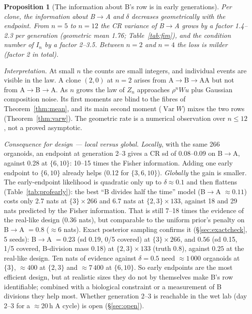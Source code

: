 \documentclass[11pt]{article}
\newtheorem{proposition}[theorem]{Proposition}
\theoremstyle{definition}
\theoremstyle{remark}
\newcommand{\Var}{\operatorname{Var}}
\begin{document}
\begin{proposition}[The information about B's row is in early generations]\label{prop:decay}
Per clone, the information about B$\to$A and $\delta$ decreases geometrically with the endpoint. From $n=5$ to $n=12$ the CR variance of B$\to$A grows by a factor 1.4--2.3 per generation (geometric mean 1.76; Table~\ref{tab:fim}), and the condition number of $I_n$ by a factor 2--3.5. Between $n=2$ and $n=4$ the loss is milder (factor 2 in total).
\end{proposition}
\noindent \emph{Interpretation.} At small $n$ the counts are small integers, and individual events are visible in the law. A clone $(2,0)$ at $n=2$ arises from A$\to$B$\to$AA but not from A$\to$B$\to$A. As $n$ grows the law of $Z_n$ approaches $\rho^nWu$ plus Gaussian composition noise. Its first moments are blind to the fibres of Theorem~\ref{thm:mean}, and its main second moment ($\Var W$) mixes the two rows (Theorem~\ref{thm:varw}). The geometric rate is a numerical observation over $n\le12$, not a proved asymptotic.

\noindent \emph{Consequence for design --- local versus global.} \emph{Locally}, with the same 266 organoids, an endpoint at generation 2--3 gives a CR sd of 0.08--0.09 on B$\to$A, against 0.28 at $\{6,10\}$: 10--15 times the Fisher information. Adding one early endpoint to $\{6,10\}$ already helps (0.12 for $\{3,6,10\}$). \emph{Globally} the gain is smaller. The early-endpoint likelihood is quadratic only up to $\delta\approx0.1$ and then flattens (Table~\ref{tab:profearly}): the best ``B divides half the time'' model (B$\to$A $\approx0.11$) costs only 2.7 nats at $\{3\}\times266$ and 6.7 nats at $\{2,3\}\times133$, against 18 and 29 nats predicted by the Fisher information. That is still 7--18 times the evidence of the real-like design (0.36 nats), but comparable to the uniform prior's penalty on B$\to$A $=0.8$ ($\approx6$ nats). Exact posterior sampling confirms it (\S\ref{sec:exactcheck}, 5 seeds): B$\to$A $=0.23$ (sd 0.19, 0/5 covered) at $\{3\}\times266$, and $0.56$ (sd 0.15, 1/5 covered, B-division mass 0.18) at $\{2,3\}\times133$ (truth 0.8), against $0.25$ at the real-like design. Ten nats of evidence against $\delta=0.5$ need $\approx1\,000$ organoids at $\{3\}$, $\approx400$ at $\{2,3\}$ and $\approx7\,400$ at $\{6,10\}$. So early endpoints are the most efficient design, but at realistic sizes they do not by themselves make B's row identifiable; combined with a biological constraint or a measurement of B divisions they help most. Whether generation 2--3 is reachable in the wet lab (day 2--3 for a $\approx$20\,h A cycle) is open (\S\ref{sec:open}).
\end{document}
